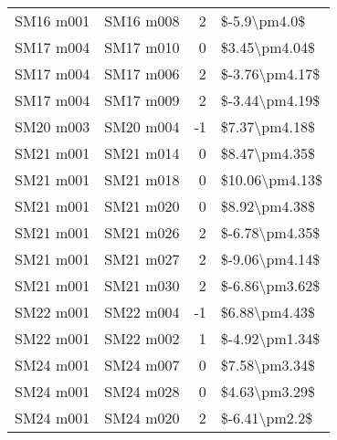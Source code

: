 \begin{longtable}{llrl}
 SM16 m001 &     SM16 m008 &       2 &    \$-5.9\textbackslash pm4.0\$ \\
 SM17 m004 &     SM17 m010 &       0 &   \$3.45\textbackslash pm4.04\$ \\
 SM17 m004 &     SM17 m006 &       2 &  \$-3.76\textbackslash pm4.17\$ \\
 SM17 m004 &     SM17 m009 &       2 &  \$-3.44\textbackslash pm4.19\$ \\
 SM20 m003 &     SM20 m004 &      -1 &   \$7.37\textbackslash pm4.18\$ \\
 SM21 m001 &     SM21 m014 &       0 &   \$8.47\textbackslash pm4.35\$ \\
 SM21 m001 &     SM21 m018 &       0 &  \$10.06\textbackslash pm4.13\$ \\
 SM21 m001 &     SM21 m020 &       0 &   \$8.92\textbackslash pm4.38\$ \\
 SM21 m001 &     SM21 m026 &       2 &  \$-6.78\textbackslash pm4.35\$ \\
 SM21 m001 &     SM21 m027 &       2 &  \$-9.06\textbackslash pm4.14\$ \\
 SM21 m001 &     SM21 m030 &       2 &  \$-6.86\textbackslash pm3.62\$ \\
 SM22 m001 &     SM22 m004 &      -1 &   \$6.88\textbackslash pm4.43\$ \\
 SM22 m001 &     SM22 m002 &       1 &  \$-4.92\textbackslash pm1.34\$ \\
 SM24 m001 &     SM24 m007 &       0 &   \$7.58\textbackslash pm3.34\$ \\
 SM24 m001 &     SM24 m028 &       0 &   \$4.63\textbackslash pm3.29\$ \\
 SM24 m001 &     SM24 m020 &       2 &   \$-6.41\textbackslash pm2.2\$ \\
\end{longtable}
